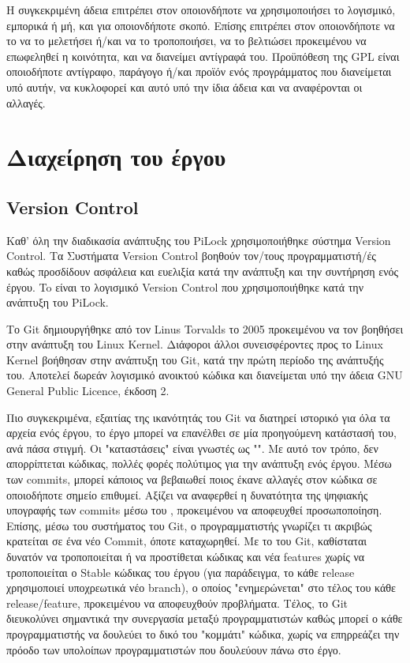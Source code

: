 	Η συγκεκριμένη άδεια επιτρέπει στον οποιονδήποτε να χρησιμοποιήσει το λογισμικό, εμπορικά ή μή, και για οποιονδήποτε σκοπό. Επίσης επιτρέπει στον οποιονδήποτε να το να το μελετήσει ή/και να το τροποποιήσει, να το βελτιώσει προκειμένου να επωφεληθεί η κοινότητα, και να διανείμει αντίγραφά του. Προϋπόθεση της GPL είναι οποιοδήποτε αντίγραφο, παράγογο ή/και προϊόν ενός προγράμματος που διανείμεται υπό αυτήν, να κυκλοφορεί και αυτό υπό την ίδια άδεια και να αναφέρονται οι αλλαγές.

\section{Διαχείρηση του έργου}

	\subsection{Version Control}
		\label{subsec:vc}
		Καθ' όλη την διαδικασία ανάπτυξης του PiLock χρησιμοποιήθηκε σύστημα Version Control. Τα Συστήματα Version Control βοηθούν τον/τους προγραμματιστή/ές καθώς προσδίδουν ασφάλεια και ευελιξία κατά την ανάπτυξη και την συντήρηση ενός έργου. To  είναι το λογισμικό Version Control που χρησιμοποιήθηκε κατά την ανάπτυξη του PiLock.

		Το Git δημιουργήθηκε από τον Linus Torvalds το 2005 προκειμένου να τον βοηθήσει στην ανάπτυξη του Linux Kernel\textsuperscript{\cite{Git_History}}. Διάφοροι άλλοι συνεισφέροντες προς το Linux Kernel βοήθησαν στην ανάπτυξη του Git, κατά την πρώτη περίοδο της ανάπτυξής του. Αποτελεί δωρεάν λογισμικό ανοικτού κώδικα και διανείμεται υπό την άδεια GNU General Public Licence, έκδοση 2\textsuperscript{\cite{Git_Licence}}. 

		Πιο συγκεκριμένα, εξαιτίας της ικανότητάς του Git να διατηρεί ιστορικό για όλα τα αρχεία ενός έργου, το έργο μπορεί να επανέλθει σε μία προηγούμενη κατάστασή του, ανά πάσα στιγμή. Οι "καταστάσεις" είναι γνωστές ως "". Με αυτό τον τρόπο, δεν απορρίπτεται κώδικας, πολλές φορές πολύτιμος για την ανάπτυξη ενός έργου. Μέσω των commits, μπορεί κάποιος να βεβαιωθεί ποιος έκανε αλλαγές στον κώδικα σε οποιοδήποτε σημείο επιθυμεί. Αξίζει να αναφερθεί η δυνατότητα της ψηφιακής υπογραφής των commits μέσω του , προκειμένου να αποφευχθεί προσωποποίηση\textsuperscript{\cite{Git_commit_assurance}}. Επίσης, μέσω του συστήματος  του Git, ο προγραμματιστής γνωρίζει τι ακριβώς κρατείται σε ένα νέο Commit, όποτε καταχωρηθεί. Με το  του Git, καθίσταται δυνατόν να τροποποιείται ή να προστίθεται κώδικας και νέα features χωρίς να τροποποιείται ο Stable κώδικας του έργου (για παράδειγμα, το κάθε release χρησιμοποιεί υποχρεωτικά νέο branch), ο οποίος "ενημερώνεται" στο τέλος του κάθε release/feature, προκειμένου να αποφευχθούν προβλήματα. Τέλος, το Git διευκολύνει σημαντικά την συνεργασία μεταξύ προγραμματιστών καθώς μπορεί ο κάθε προγραμματιστής να δουλεύει το δικό του "κομμάτι" κώδικα, χωρίς να επηρρεάζει την πρόοδο των υπολοίπων προγραμματιστών που δουλεύουν πάνω στο έργο.

